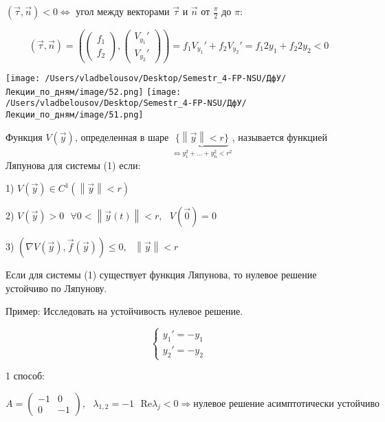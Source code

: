 \documentclass[12pt, a4paper]{report}
\begin{document}
\( (\vec{\tau  } , \vec{n }  )< 0 \Leftrightarrow   \) угол между векторами \( \vec{\tau}  \) и \( \vec{ n}  \) от \( \displaystyle  \frac{\pi}{2 }  \)  до \( \pi \): 

\[ (\vec{\tau  } , \vec{n }  ) = \left(  \begin{pmatrix}
f_1 \\
f_2
\end{pmatrix}, \begin{pmatrix}
V _{y_1 } '  \\
V_{y_2 } ' 
\end{pmatrix} \right) = f_1 V_{y_1 } ' + f_2 V_{ y_2 } ' = f_1 2 y_1 + f_2 2 y_2 < 0   \] 

\begin{center}
    \texttt{[image: /Users/vladbelousov/Desktop/Semestr\_4-FP-NSU/ДфУ/Лекции\_по\_дням/image/52.png]}
    \texttt{[image: /Users/vladbelousov/Desktop/Semestr\_4-FP-NSU/ДфУ/Лекции\_по\_дням/image/51.png]}
\end{center}

\begin{definition}
    Функция \( V (\vec{y }  ) \), определенная  в шаре  \( \underbrace{ \{\left\lVert \vec{y }   \right\rVert < r\}}_{\Leftrightarrow  y_1 ^2 + ... + y_n ^2 < r ^2 } \), называется функцией Ляпунова для системы (1) если: 

    1) \( V (\vec{y } ) \in  C^1 (\left\lVert \vec{y }  \right\rVert < r ) \) 

    2) \( V (\vec{y }  ) > 0 \text{ }  \forall 0 < \left\lVert  \vec{ y}  (t) \right\rVert < r , \text{ }  V(\vec{ 0 } ) =0  \) 

    3) \( (\nabla V(\vec{y } ) , \vec{f } (\vec{y } ) ) \le  0 , \text{  }  \left\lVert \vec{y }  \right\rVert < r\)
\end{definition}

\begin{theorem}
    Если для системы (1) существует функция Ляпунова, то нулевое решение устойчиво по Ляпунову.
\end{theorem}

Пример: Исследовать на устойчивость нулевое решение. 

\[ \begin{cases}
y_1 ' = - y_1  \\ 
y_2 ' = -y_2
\end{cases} \]

1 способ: 

\[ A= \begin{pmatrix}
-1 & 0\\
0 & -1
\end{pmatrix}, \text{ }  \lambda_{1,2} = -1  \text{ }  \mathrm{Re } \lambda_j <  0 \Rightarrow \text{нулевое решение асимптотически устойчиво }    \] 
\end{document}
